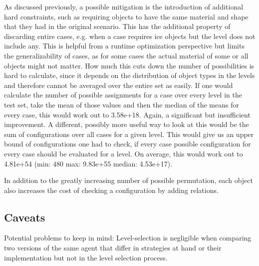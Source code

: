 As discussed previously, a possible mitigation is the introduction of additional hard constraints, such as requiring objects to have the same material and shape that they had in the original scenario.
This has the additional property of discarding entire cases, e.g. when a case requires ice objects but the level does not include any.
This is helpful from a runtime optimization perspective but limits the generalizability of cases, as for some cases the actual material of some or all objects might not matter.
How much this cuts down the number of possibilities is hard to calculate, since it depends on the distribution of object types in the levels and therefore cannot be averaged over the entire set as easily.
If one would calculate the number of possible assignments for a case over every level in the test set, take the mean of those values and then the median of the means for every case, this would work out to 3.58e+18. Again, a significant but insufficient improvement.
A different, possibly more useful way to look at this would be the sum of configurations over all cases for a given level. This would give us an upper bound of configurations one had to check, if every case possible configuration for every case should be evaluated for a level. On average, this would work out to 4.81e+54 (min: 480 max: 9.83e+55 median: 4.53e+17).

In addition to the greatly increasing number of possible permutation, each object also increases the cost of checking a configuration by adding relations.


\subsection{Caveats}\label{subsec:experimental-caveats}
Potential problems to keep in mind: Level-selection is negligible when comparing two versions of the same agent that differ in strategies at hand or their implementation but not in the level selection process.
%

%

%



